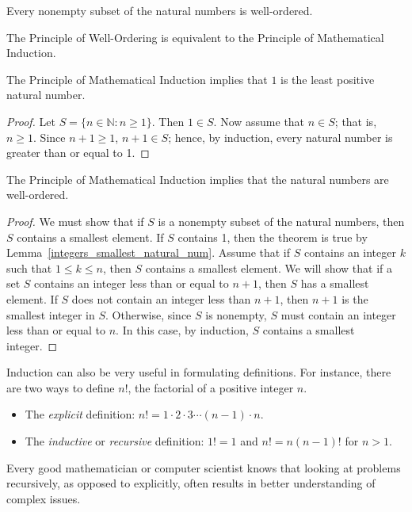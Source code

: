 \medskip
 
Every nonempty subset of the natural numbers is well-ordered. 

\medskip
 
The Principle of Well-Ordering is equivalent to the Principle  of Mathematical Induction. 
 
\begin{lemma}\label{integers_smallest_natural_num}
The Principle of Mathematical Induction implies that $1$ is the least positive natural number. 
\end{lemma}

\begin{proof}
Let $S = \{ n \in {\mathbb N} : n \geq 1 \}$. Then $1 \in S$.  Now assume that $n \in S$; that is, $n \geq 1$.  Since $n+1 \geq 1$, $n+ 1 \in S$; hence, by induction, every natural number is greater than or equal to 1. 
\end{proof}

\begin{theorem}\label{integers_PMI_implies_PWO}
The Principle of Mathematical Induction implies that the natural numbers are well-ordered. 
\end{theorem}
 
\begin{proof}
We must show that if $S$ is a nonempty subset of the natural numbers, then $S$ contains a smallest element.  If $S$ contains 1, then the theorem is true by Lemma~\ref{integers_smallest_natural_num}.  Assume that if $S$ contains an integer $k$ such that $1 \leq k \leq n$, then $S$ contains a smallest element.  We will show that if a set $S$ contains an integer less than or equal to $n + 1$, then $S$ has a smallest element.  If $S$ does not contain an integer less than $n+1$, then $n+1$ is the smallest integer in $S$.  Otherwise, since $S$ is nonempty, $S$ must contain an integer less than or equal to $n$. In this case, by induction, $S$ contains a smallest integer. 
\mbox{\hspace{1in}} 
\end{proof}
 
\medskip
 
Induction can also be very useful in formulating definitions.  For instance, there are two ways to define $n!$, the factorial of a positive integer $n$. 
\begin{itemize}
 
\item 
The {\em explicit\/} definition: $n! = 1 \cdot 2 \cdot 3 \cdots (n - 1)
\cdot n$. 
 
\item 
The {\em inductive\/} or {\em recursive\/} definition: $1! = 1$ and
$n! = n(n - 1)!$ for $n > 1$. 
 
\end{itemize}
Every good mathematician or computer scientist knows that looking at problems recursively, as opposed to explicitly, often results in better understanding of complex issues.  

